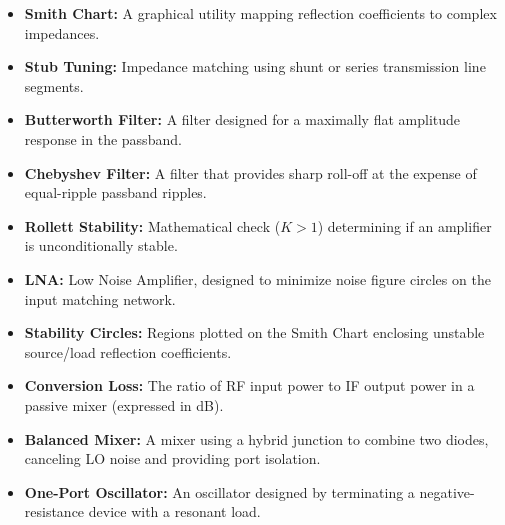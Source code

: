 \documentclass[12pt,a4paper]{article}
\begin{document}
\begin{tcolorbox}[defbox, title={\textbf{One-Line Definitions}}]
\begin{itemize}[leftmargin=*, itemsep=2.5pt, topsep=0pt]
  \item \textbf{Smith Chart:} A graphical utility mapping reflection coefficients to complex impedances.
  \item \textbf{Stub Tuning:} Impedance matching using shunt or series transmission line segments.
  \item \textbf{Butterworth Filter:} A filter designed for a maximally flat amplitude response in the passband.
  \item \textbf{Chebyshev Filter:} A filter that provides sharp roll-off at the expense of equal-ripple passband ripples.
  \item \textbf{Rollett Stability:} Mathematical check ($K > 1$) determining if an amplifier is unconditionally stable.
  \item \textbf{LNA:} Low Noise Amplifier, designed to minimize noise figure circles on the input matching network.
  \item \textbf{Stability Circles:} Regions plotted on the Smith Chart enclosing unstable source/load reflection coefficients.
  \item \textbf{Conversion Loss:} The ratio of RF input power to IF output power in a passive mixer (expressed in dB).
  \item \textbf{Balanced Mixer:} A mixer using a hybrid junction to combine two diodes, canceling LO noise and providing port isolation.
  \item \textbf{One-Port Oscillator:} An oscillator designed by terminating a negative-resistance device with a resonant load.
\end{itemize}
\end{tcolorbox}
\end{document}
